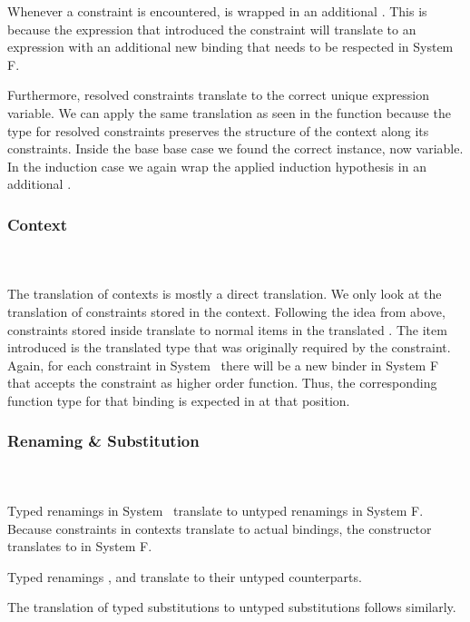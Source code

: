 \noindent Whenever a constraint is encountered,  is wrapped in an additional . 
This is because the expression that introduced the constraint will translate to an expression with an additional new binding that needs to be respected in System F.

\noindent Furthermore, resolved constraints translate to the correct unique expression variable. We can apply the same translation as seen in the function  because the type for resolved constraints \Data{[}  \Data{]∈}  preserves the structure of the context along its constraints. 
\DPTOVar
Inside the base base case we found the correct instance, now variable.
In the induction case  we again wrap the applied induction hypothesis in an additional .
\subsubsection{Context}\hfill\\\\
The translation of contexts is mostly a direct translation. 
We only look at the translation of constraints stored in the context.
\DPTCtx
Following the idea from above, constraints  \Constr{:}  stored inside  translate to normal items in the translated . 
The item introduced is the translated type   that was originally required by the constraint. Again, for each constraint in System \Fo\ there will be a new binder in System F that accepts the constraint as higher order function. 
Thus, the corresponding function type for that binding is expected in  at that position.

\subsubsection{Renaming \& Substitution}\hfill\\\\
Typed renamings in System \Fo\ translate to untyped renamings in System F.
\DPTRen
\noindent Because constraints in contexts translate to actual bindings, the constructor  translates to  in System F.

\noindent Typed renamings ,  and  translate to their untyped counterparts. 

\noindent The translation of typed substitutions to untyped substitutions follows similarly.
\DPTSub 

